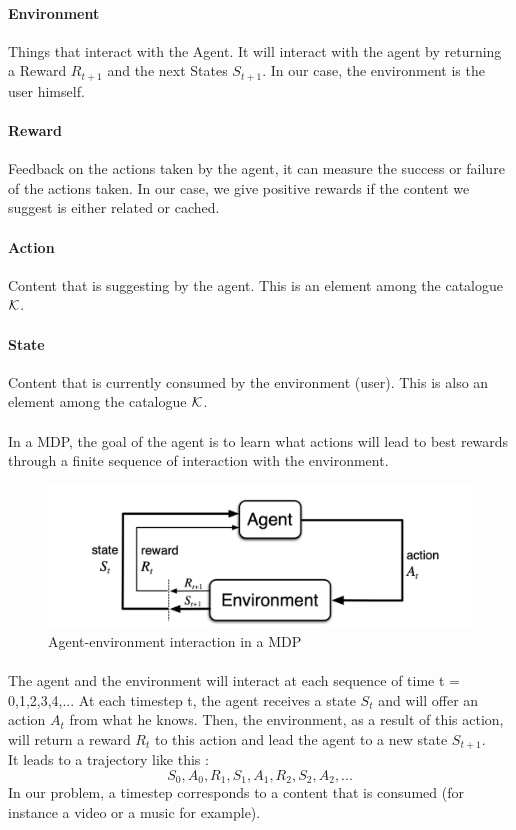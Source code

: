 \documentclass[a4paper]{article}
\begin{document}
\paragraph{Environment} Things that interact with the Agent. It will interact with the agent by returning a Reward $R_{t+1}$ and the next States $S_{t+1}$. In our case, the environment is the user himself.  
\paragraph{Reward}  Feedback on the actions taken by the agent, it can measure the success or failure of the actions taken. In our case, we give positive rewards if the content we suggest is either related or cached.
\paragraph{Action} Content that is suggesting by the agent. This is an element among the catalogue $\cal{K}$. 
\paragraph{State} Content that is currently consumed by the environment (user). This is also an element among the catalogue $\cal{K}$. 




\paragraph{} In a MDP, the goal of the agent is to learn what actions will lead to best rewards through a finite sequence of interaction with the environment. 

\begin{figure}[h!]
\begin{center}
\includegraphics[width=0.8\linewidth]{img/mdp.png}
\caption{Agent-environment interaction in a MDP}
\end{center}
\end{figure}

\paragraph{} The agent and the environment will interact at each sequence of time t = 0,1,2,3,4,... At each timestep t, the agent receives a state $S_t$ and will offer an action $A_t$ from what he knows. Then, the environment, as a result of this action, will return a reward $R_t$ to this action and lead the agent to a new state $S_{t+1}$. \\
It leads to a trajectory like this : 
\[ S_0, A_0,  R_1, S_1, A_1, R_2, S_2, A_2, ... \]
In our problem, a timestep corresponds to a content that is consumed (for instance a video or a music for example).
\end{document}

